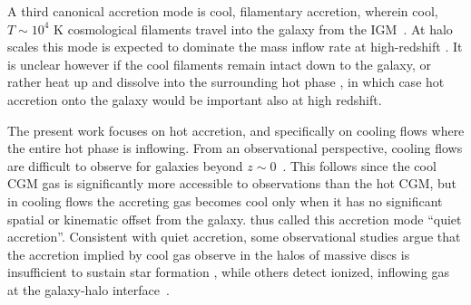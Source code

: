 \documentclass[fleqn,usenatbib]{mnras}
\begin{document}
A third canonical accretion mode is cool, filamentary accretion, wherein cool, $T \sim 10^4$ K cosmological filaments travel into the galaxy from the IGM~\cite[e.g.][]{Keres2005, Dekel2006, Keres2009, Martin2019a}. At halo scales this mode is expected to dominate the mass inflow rate at high-redshift \citep[$z\gtrsim2$, e.g.][]{Keres2009a, Dekel2009, Huscher2020}. It is unclear however if the cool filaments remain intact down to the galaxy, or rather heat up and dissolve into the surrounding hot phase \citep{Nelson2016, Mandelker+}, in which case hot accretion onto the galaxy would be important also at high redshift. 



The present work focuses on hot accretion, and specifically on cooling flows where the entire hot phase is inflowing.  
From an observational perspective, cooling flows are difficult to observe for galaxies beyond
$z\sim0$~\citep{Putman2012}.
This follows since the cool CGM gas is significantly more accessible to observations than the hot CGM, but in cooling flows the accreting gas becomes cool only when it has no significant spatial or kinematic offset from the galaxy.
\citeauthor{Putman2012} thus called this accretion mode ``quiet accretion''. 
Consistent with quiet accretion, some observational studies argue that the accretion implied by cool gas observe in the halos of massive discs is insufficient to sustain star formation \citep{Binney09}, while others detect ionized, inflowing gas at the galaxy-halo interface~\citep{Zheng2017}. 

\end{document}
